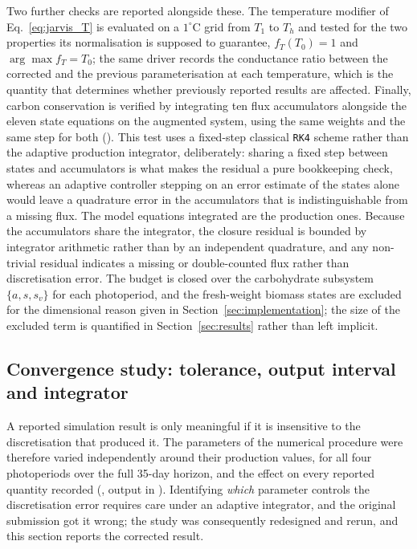 \documentclass[a4paper,fleqn]{cas-sc}
\begin{document}
Two further checks are reported alongside these. The temperature modifier of
Eq.~\eqref{eq:jarvis_T} is evaluated on a $1^{\circ}$C grid from $T_1$ to
$T_h$ and tested for the two properties its normalisation is supposed to
guarantee, $f_T(T_0)=1$ and $\arg\max f_T = T_0$; the same driver records
the conductance ratio between the corrected and the previous
parameterisation at each temperature, which is the quantity that determines
whether previously reported results are affected. Finally, carbon
conservation is verified by integrating ten flux accumulators alongside the
eleven state equations on the augmented system, using the same weights and the
same step for both (). This test uses a
fixed-step classical \texttt{RK4} scheme rather than the adaptive production
integrator, deliberately: sharing a fixed step between states and accumulators
is what makes the residual a pure bookkeeping check, whereas an adaptive
controller stepping on an error estimate of the states alone would leave a
quadrature error in the accumulators that is indistinguishable from a missing
flux. The model equations integrated are the production ones. Because the
accumulators share the integrator, the closure residual is bounded by
integrator arithmetic rather
than by an independent quadrature, and any non-trivial residual indicates a
missing or double-counted flux rather than discretisation error. The budget
is closed over the carbohydrate subsystem $\{a,s,s_v\}$ for each
photoperiod, and the fresh-weight biomass states are excluded for the
dimensional reason given in Section~\ref{sec:implementation}; the size of
the excluded term is quantified in Section~\ref{sec:results} rather than
left implicit.

\subsection{Convergence study: tolerance, output interval and integrator}
\label{sec:convergence_study}

A reported simulation result is only meaningful if it is insensitive to the
discretisation that produced it. The parameters of the numerical procedure
were therefore varied independently around their production values, for all
four photoperiods over the full 35-day horizon, and the effect on every
reported quantity recorded (, output in
). Identifying \emph{which} parameter controls the
discretisation error requires care under an adaptive integrator, and the
original submission got it wrong; the study was consequently redesigned and
rerun, and this section reports the corrected result.
\end{document}
